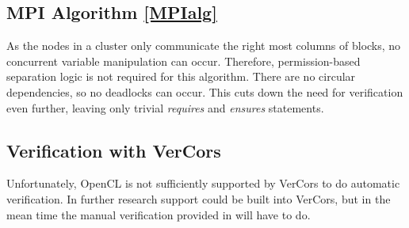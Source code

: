 \subsection{MPI Algorithm \ref*{MPIalg}} \label{ver:MPIalg}
As the nodes in a cluster only communicate the right most columns of blocks, no concurrent variable manipulation can occur.
Therefore, permission-based separation logic is not required for this algorithm.
There are no circular dependencies, so no deadlocks can occur.
This cuts down the need for verification even further, leaving only trivial \textit{requires} and \textit{ensures} statements.

\subsection{Verification with VerCors} \label{ver:vercors}
Unfortunately, OpenCL is not sufficiently supported by VerCors to do automatic verification.
In further research support could be built into VerCors, but in the mean time the manual verification provided in  will have to do.
